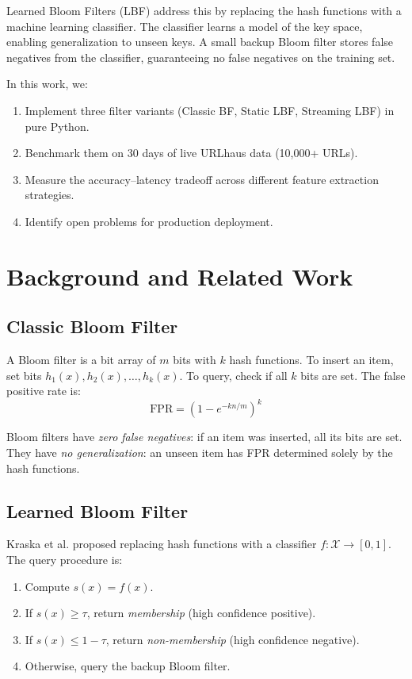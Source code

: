 \documentclass[11pt,a4paper]{article}
\begin{document}
Learned Bloom Filters (LBF) \cite{kraska2018, mitzenmacher2018} address this by replacing the hash functions with a machine learning classifier. The classifier learns a model of the key space, enabling generalization to unseen keys. A small backup Bloom filter stores false negatives from the classifier, guaranteeing no false negatives on the training set.

In this work, we:
\begin{enumerate}
    \item Implement three filter variants (Classic BF, Static LBF, Streaming LBF) in pure Python.
    \item Benchmark them on 30 days of live URLhaus data (10,000+ URLs).
    \item Measure the accuracy--latency tradeoff across different feature extraction strategies.
    \item Identify open problems for production deployment.
\end{enumerate}

\section{Background and Related Work}

\subsection{Classic Bloom Filter}

A Bloom filter \cite{bloom1970} is a bit array of $m$ bits with $k$ hash functions. To insert an item, set bits $h_1(x), h_2(x), \ldots, h_k(x)$. To query, check if all $k$ bits are set. The false positive rate is:
\begin{equation}
    \text{FPR} = \left(1 - e^{-kn/m}\right)^k
\end{equation}

Bloom filters have \textit{zero false negatives}: if an item was inserted, all its bits are set. They have \textit{no generalization}: an unseen item has FPR determined solely by the hash functions.

\subsection{Learned Bloom Filter}

Kraska et al. \cite{kraska2018} proposed replacing hash functions with a classifier $f: \mathcal{X} \rightarrow [0,1]$. The query procedure is:
\begin{enumerate}
    \item Compute $s(x) = f(x)$.
    \item If $s(x) \geq \tau$, return \textit{membership} (high confidence positive).
    \item If $s(x) \leq 1-\tau$, return \textit{non-membership} (high confidence negative).
    \item Otherwise, query the backup Bloom filter.
\end{enumerate}
\end{document}
